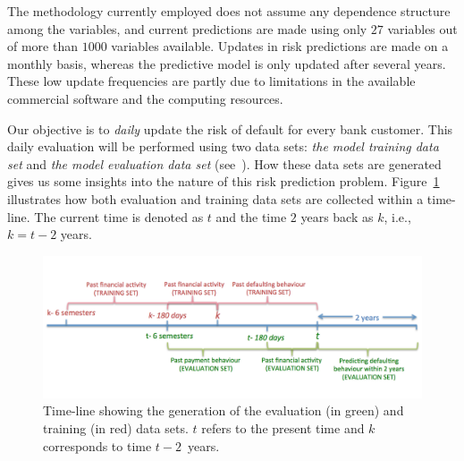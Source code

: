 The methodology currently employed does not assume any dependence structure among the variables, and current predictions are made using only $27$ variables out of more than $1000$ variables available. Updates in risk predictions are made on a monthly basis, whereas the predictive model is only updated after several years. These low update frequencies are partly due to limitations in the available commercial software and the computing resources.

Our objective is to \textit{daily} update the risk of default for every bank customer. This daily evaluation will be performed using two data sets: \textit{the model training data set} and \textit{the model evaluation data set} (see~\cite{Fer14b}). How these data sets are generated gives us some insights into the nature of this risk prediction problem. Figure~\ref{Figure:CajaMarTimeLine} illustrates how both evaluation and training data sets are collected within a time-line. The current time is denoted as $t$ and the time $2$ years back as $k$, i.e., $k=t-2$ years. 

\begin{figure}[htbp]
\centering
\includegraphics[scale=0.65]{figures/CajaMarTimeLine}
\caption{\label{Figure:CajaMarTimeLine}Time-line showing the generation of the evaluation (in green) and training (in red) data sets. $t$ refers to the present time and $k$ corresponds to time $t-2$\ years.}
\end{figure}


